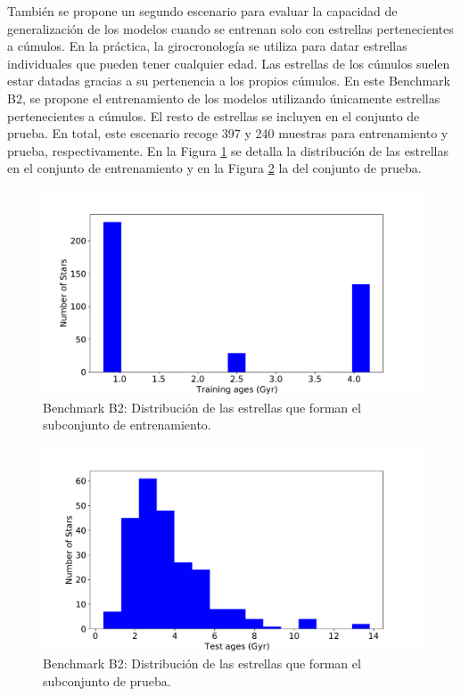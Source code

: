 También se propone un segundo escenario para evaluar la capacidad de generalización de los modelos cuando se entrenan solo con estrellas pertenecientes a cúmulos. En la práctica, la girocronología se utiliza para datar estrellas individuales que pueden tener cualquier edad. Las estrellas de los cúmulos suelen estar datadas gracias a su pertenencia a los propios cúmulos. En este Benchmark B2, se propone el entrenamiento de los modelos utilizando únicamente estrellas pertenecientes a cúmulos. El resto de estrellas se incluyen en el conjunto de prueba. En total, este escenario recoge 397 y 240 muestras para entrenamiento y prueba, respectivamente. En la Figura \ref{fig:benchB2_train} se detalla la distribución de las estrellas en el conjunto de entrenamiento y en la Figura \ref{fig:benchB2_test} la del conjunto de prueba.

\begin{figure}[H]
\begin{center}
 \includegraphics[width=0.8\linewidth]{Figuras/Experimentos/B_B2_training.pdf}
\end{center}
\caption{Benchmark B2: Distribución de las estrellas que forman el subconjunto de entrenamiento.}
 \label{fig:benchB2_train}
\end{figure}

\begin{figure}[H]
\begin{center}
 \includegraphics[width=0.8\linewidth]{Figuras/Experimentos/B_B2_test.pdf}
\end{center}
\caption{Benchmark B2: Distribución de las estrellas que forman el subconjunto de prueba.}
 \label{fig:benchB2_test}
\end{figure}


